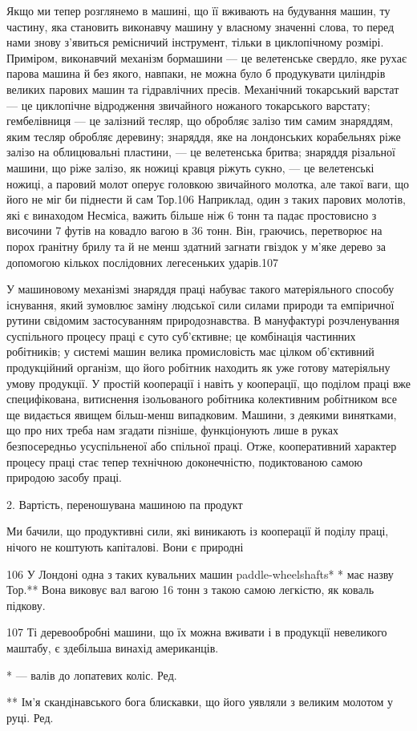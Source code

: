 Якщо ми тепер розглянемо в машині, що її вживають на будування
машин, ту частину, яка становить виконавчу машину у
власному значенні слова, то перед нами знову з’явиться ремісничий
інструмент, тільки в циклопічному розмірі. Приміром, виконавчий
механізм бормашини — це велетенське свердло, яке рухає
парова машина й без якого, навпаки, не можна було б продукувати
циліндрів великих парових машин та гідравлічних пресів.
Механічний токарський варстат — це циклопічне відродження
звичайного ножаного токарського варстату; гембелівниця — це
залізний тесляр, що обробляє залізо тим самим знаряддям, яким
тесляр обробляє деревину; знаряддя, яке на лондонських корабельнях
ріже залізо на облицювальні пластини, — це велетенська
бритва; знаряддя різальної машини, що ріже залізо, як ножиці
кравця ріжуть сукно, — це велетенські ножиці, а паровий молот
оперує головкою звичайного молотка, але такої ваги, що його
не міг би піднести й сам Тор.106 Наприклад, один з таких парових
молотів, які є винаходом Несміса, важить більше ніж 6 тонн
та падає простовисно з височини 7 футів на ковадло вагою в
36 тонн. Він, граючись, перетворює на порох ґранітну брилу та
й не менш здатний загнати гвіздок у м’яке дерево за допомогою
кількох послідовних легесеньких ударів.107

У машиновому механізмі знаряддя праці набуває такого матеріяльного
способу існування, який зумовлює заміну людської
сили силами природи та емпіричної рутини свідомим застосуванням
природознавства. В мануфактурі розчленування суспільного
процесу праці є суто суб’єктивне; це комбінація частинних робітників;
у системі машин велика промисловість має цілком об’єктивний
продукційний організм, що його робітник находить як
уже готову матеріяльну умову продукції. У простій кооперації і
навіть у кооперації, що поділом праці вже специфікована, витиснення
ізольованого робітника колективним робітником все ще
видається явищем більш-менш випадковим. Машини, з деякими
винятками, що про них треба нам згадати пізніше, функціонують
лише в руках безпосередньо усуспільненої або спільної праці.
Отже, кооперативний характер процесу праці стає тепер технічною
доконечністю, подиктованою самою природою засобу праці.

2. Вартість, переношувана машиною па продукт

Ми бачили, що продуктивні сили, які виникають із кооперації
й поділу праці, нічого не коштують капіталові. Вони є природні

106 У Лондоні одна з таких кувальних машин paddle-wheelshafts* *
має назву Тор.** Вона виковує вал вагою 16 тонн з такою самою легкістю,
як коваль підкову.

107 Ті деревообробні машини, що їх можна вживати і в продукції
невеликого маштабу, є здебільша винахід американців.

* — валів до лопатевих коліс. Ред.

** Ім’я скандінавського бога блискавки, що його уявляли з великим
молотом у руці. Ред.
